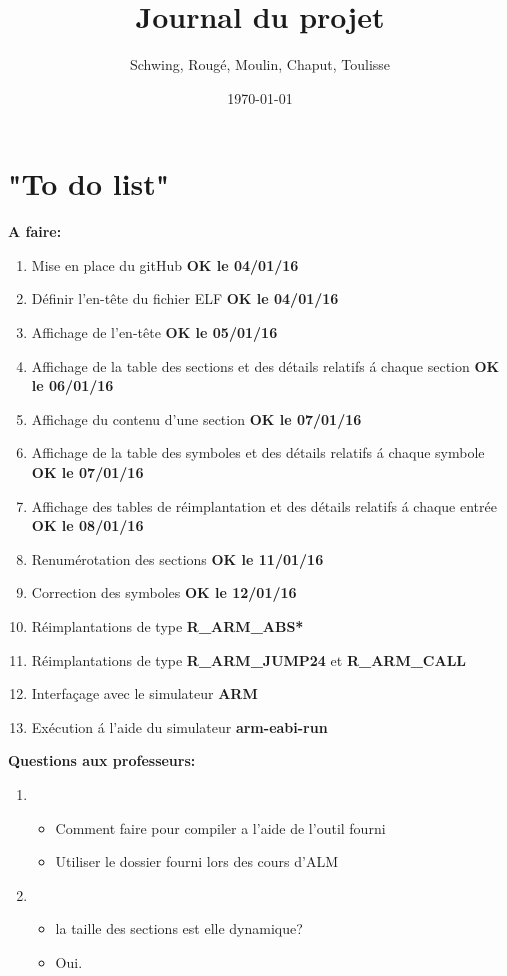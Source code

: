 \documentclass[12pt, a4paper]{article}
\title{Journal du projet}
\author{Schwing, Roug\'e, Moulin, Chaput, Toulisse}
\date{\today}
\begin{document}
\maketitle

\section{"To do list"}
\textbf{A faire:}
\begin{enumerate}
\item Mise en place du gitHub \textbf{OK le 04/01/16} 
\item Définir l'en-t\^ete du fichier ELF \textbf{OK le 04/01/16}
\item Affichage de l'en-t\^ete \textbf{OK le 05/01/16} 
\item Affichage de la table des sections et des détails
	relatifs \'a chaque section \textbf{OK le 06/01/16} 
\item Affichage du contenu d'une section \textbf{OK le 07/01/16} 
\item Affichage de la table des symboles et des détails relatifs 
	\'a chaque symbole \textbf{OK le 07/01/16} 
\item Affichage des tables de réimplantation et des détails relatifs 
	\'a chaque entrée \textbf{OK le 08/01/16} 
\item Renumérotation des sections \textbf{OK le 11/01/16} 
\item Correction des symboles \textbf{OK le 12/01/16} 
\item Réimplantations de type \textbf{R\_ARM\_ABS*}
\item Réimplantations de type \textbf{R\_ARM\_JUMP24} et 
	\textbf{R\_ARM\_CALL}
\item Interfaçage avec le simulateur \textbf{ARM}
\item Exécution \'a l'aide du simulateur \textbf{arm-eabi-run}
\end{enumerate}

\textbf{Questions aux professeurs:}
\begin{enumerate}
\item 
	\begin{itemize}
		\item Comment faire pour compiler a l'aide de l'outil fourni
		\item Utiliser le dossier fourni lors des cours d'ALM
	\end{itemize}
\item 
	\begin{itemize}
		\item la taille des sections est elle dynamique?
		\item Oui.
	\end{itemize}
\end{enumerate}
\end{document}
